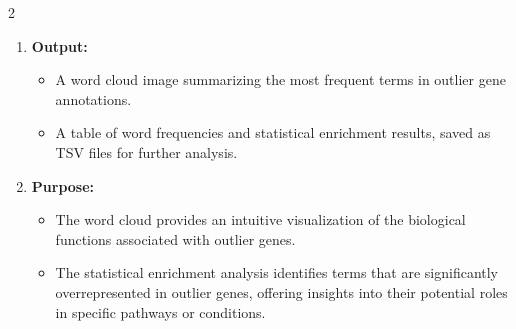 2\documentclass{article}
\begin{document}
\begin{enumerate}
    \item \textbf{Output:}
    \begin{itemize}
        \item A word cloud image summarizing the most frequent terms in outlier gene annotations.
        \item A table of word frequencies and statistical enrichment results, saved as TSV files for further analysis.
    \end{itemize}

    \item \textbf{Purpose:}
    \begin{itemize}
        \item The word cloud provides an intuitive visualization of the biological functions associated with outlier genes.
        \item The statistical enrichment analysis identifies terms that are significantly overrepresented in outlier genes, offering insights into their potential roles in specific pathways or conditions.
    \end{itemize}
\end{enumerate}
\end{document}
